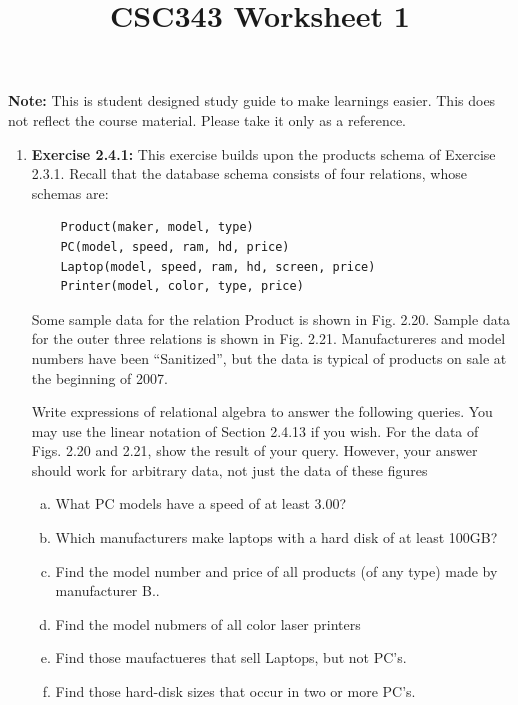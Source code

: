 \documentclass[12pt]{article}
\begin{document}
\title{CSC343 Worksheet 1}
\maketitle

\noindent \textbf{Note:} This is student designed study guide to make learnings easier.
This does not reflect the course material. Please take it only as a reference.

\begin{enumerate}[1.]
    \item \textbf{Exercise 2.4.1:} This exercise builds upon the products schema of
    Exercise 2.3.1. Recall that the database schema consists of four relations, whose
    schemas are:

    \begin{lstlisting}
    Product(maker, model, type)
    PC(model, speed, ram, hd, price)
    Laptop(model, speed, ram, hd, screen, price)
    Printer(model, color, type, price)
    \end{lstlisting}

    \bigskip

    Some sample data for the relation Product is shown in Fig. 2.20. Sample data
    for the outer three relations is shown in Fig. 2.21. Manufactureres and model
    numbers have been ``Sanitized'', but the data is typical of products on sale
    at the beginning of 2007.

    \bigskip

    Write expressions of relational algebra to answer the following queries. You
    may use the linear notation of Section 2.4.13 if you wish. For the data of Figs. 2.20
    and 2.21, show the result of your query. However, your answer should work for
    arbitrary data, not just the data of these figures

    \bigskip

    \begin{enumerate}[a)]
        \item What PC models have a speed of at least 3.00?
        \item Which manufacturers make laptops with a hard disk of at least 100GB?
        \item Find the model number and price of all products (of any type) made by manufacturer B..
        \item Find the model nubmers of all color laser printers
        \item Find those maufactueres that sell Laptops, but not PC's.
        \item Find those hard-disk sizes that occur in two or more PC's.
    \end{enumerate}


\end{enumerate}
\end{document}
